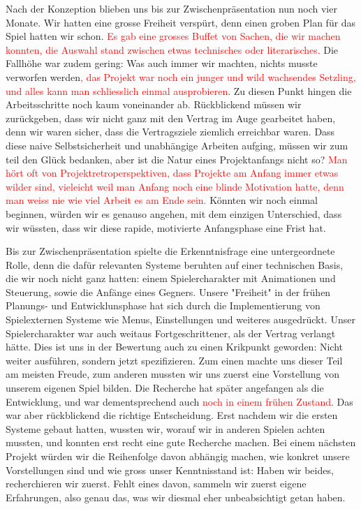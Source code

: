 \documentclass[../Main.tex]{subfiles}
\begin{document}
Nach der Konzeption blieben uns bis zur Zwischenpräsentation nun noch vier Monate. Wir hatten eine grosse Freiheit verspürt, denn einen groben Plan für das Spiel hatten wir schon. \textcolor{red}{Es gab eine grosses Buffet von Sachen, die wir machen konnten, die Auswahl stand zwischen etwas technisches oder literarisches.} Die Fallhöhe war zudem gering: Was auch immer wir machten, nichts musste verworfen werden\textcolor{red}{, das Projekt war noch ein junger und wild wachsendes Setzling, und alles kann man schliesslich einmal ausprobieren}. Zu diesen Punkt hingen die Arbeitsschritte noch kaum voneinander ab. Rückblickend müssen wir zurückgeben, dass wir nicht ganz mit den Vertrag im Auge gearbeitet haben, denn wir waren sicher, dass die Vertragsziele ziemlich erreichbar waren. Dass diese naive Selbstsicherheit und unabhängige Arbeiten aufging, müssen wir zum teil den Glück bedanken, aber ist die Natur eines Projektanfangs nicht so? \textcolor{red}{Man hört oft von Projektretroperspektiven, dass Projekte am Anfang immer etwas wilder sind, vieleicht weil man Anfang noch eine blinde Motivation hatte, denn man weiss nie wie viel Arbeit es am Ende sein.} Könnten wir noch einmal beginnen, würden wir es genauso angehen, mit dem einzigen Unterschied, dass wir wüssten, dass wir diese rapide, motivierte Anfangsphase eine Frist hat.

Bis zur Zwischenpräsentation spielte die Erkenntnisfrage eine untergeordnete Rolle, denn die dafür relevanten Systeme beruhten auf einer technischen Basis, die wir noch nicht ganz hatten: einem Spielercharakter mit Animationen und Steuerung, sowie die Anfänge eines Gegners. Unsere "Freiheit" in der frühen Planungs- und Entwicklunsphase hat sich durch die Implementierung von Spielexternen Systeme wie Menus, Einstellungen und weiteres ausgedrückt. Unser Spielercharakter war auch weitaus Fortgeschrittener, als der Vertrag verlangt hätte. Dies ist uns in der Bewertung auch zu einen Krikpunkt geworden: Nicht weiter ausführen, sondern jetzt spezifizieren. Zum einen machte uns dieser Teil am meisten Freude, zum anderen mussten wir uns zuerst eine Vorstellung von unserem eigenen Spiel bilden. Die Recherche hat später angefangen als die Entwicklung, und war dementsprechend auch \textcolor{red}{noch in einem frühen Zustand}. Das war aber rückblickend die richtige Entscheidung. Erst nachdem wir die ersten Systeme gebaut hatten, wussten wir, worauf wir in anderen Spielen achten mussten, und konnten erst recht eine gute Recherche machen. Bei einem nächsten Projekt würden wir die Reihenfolge davon abhängig machen, wie konkret unsere Vorstellungen sind und wie gross unser Kenntnisstand ist: Haben wir beides, recherchieren wir zuerst. Fehlt eines davon, sammeln wir zuerst eigene Erfahrungen, also genau das, was wir diesmal eher unbeabsichtigt getan haben.
\end{document}
